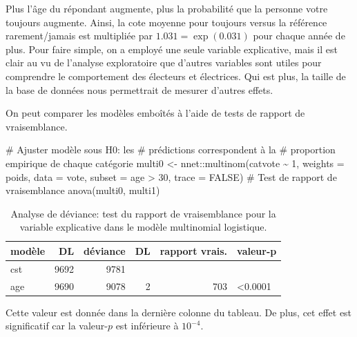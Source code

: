 \documentclass[
  11pt,
  letterpaper,
]{scrbook}
\newenvironment{Shaded}{\begin{snugshade}}{\end{snugshade}}
\newcommand{\AttributeTok}[1]{\textcolor[rgb]{0.40,0.45,0.13}{#1}}
\newcommand{\CommentTok}[1]{\textcolor[rgb]{0.37,0.37,0.37}{#1}}
\newcommand{\ConstantTok}[1]{\textcolor[rgb]{0.56,0.35,0.01}{#1}}
\newcommand{\DecValTok}[1]{\textcolor[rgb]{0.68,0.00,0.00}{#1}}
\newcommand{\FunctionTok}[1]{\textcolor[rgb]{0.28,0.35,0.67}{#1}}
\newcommand{\NormalTok}[1]{\textcolor[rgb]{0.00,0.23,0.31}{#1}}
\newcommand{\OtherTok}[1]{\textcolor[rgb]{0.00,0.23,0.31}{#1}}
\newcommand{\SpecialCharTok}[1]{\textcolor[rgb]{0.37,0.37,0.37}{#1}}
\theoremstyle{definition}
\theoremstyle{remark}
\begin{document}
Plus l'âge du répondant augmente, plus la probabilité que la personne
votre toujours augmente. Ainsi, la cote moyenne pour toujours versus la
référence rarement/jamais est multipliée par \(1.031=\exp(0.031)\) pour
chaque année de plus. Pour faire simple, on a employé une seule variable
explicative, mais il est clair au vu de l'analyse exploratoire que
d'autres variables sont utiles pour comprendre le comportement des
électeurs et électrices. Qui est plus, la taille de la base de données
nous permettrait de mesurer d'autres effets.

On peut comparer les modèles emboîtés à l'aide de tests de rapport de
vraisemblance.

\begin{Shaded}
\begin{Highlighting}[]
\CommentTok{\# Ajuster modèle sous H0: les}
\CommentTok{\# prédictions correspondent à la}
\CommentTok{\# proportion empirique de chaque catégorie}
\NormalTok{multi0 }\OtherTok{\textless{}{-}}\NormalTok{ nnet}\SpecialCharTok{::}\FunctionTok{multinom}\NormalTok{(catvote }\SpecialCharTok{\textasciitilde{}} \DecValTok{1}\NormalTok{,}
                         \AttributeTok{weights =}\NormalTok{ poids,}
                         \AttributeTok{data =}\NormalTok{ vote,}
                         \AttributeTok{subset =}\NormalTok{ age }\SpecialCharTok{\textgreater{}} \DecValTok{30}\NormalTok{,}
                         \AttributeTok{trace =} \ConstantTok{FALSE}\NormalTok{)}
\CommentTok{\# Test de rapport de vraisemblance}
\FunctionTok{anova}\NormalTok{(multi0, multi1)}
\end{Highlighting}
\end{Shaded}

\hypertarget{tbl-anova-multinom}{}
\begin{table}
\caption{\label{tbl-anova-multinom}Analyse de déviance: test du rapport de vraisemblance pour la variable
explicative dans le modèle multinomial logistique. }\tabularnewline

\centering
\begin{tabular}{lrrrrl}
\toprule
modèle & DL & déviance & DL & rapport vrais. & valeur-p\\
\midrule
cst & 9692 & 9781 &  &  & \\
age & 9690 & 9078 & 2 & 703 & <0.0001\\
\bottomrule
\end{tabular}
\end{table}

Cette valeur est donnée dans la dernière colonne du tableau. De plus,
cet effet est significatif car la valeur-\(p\) est inférieure à
\(10^{-4}\).
\end{document}
